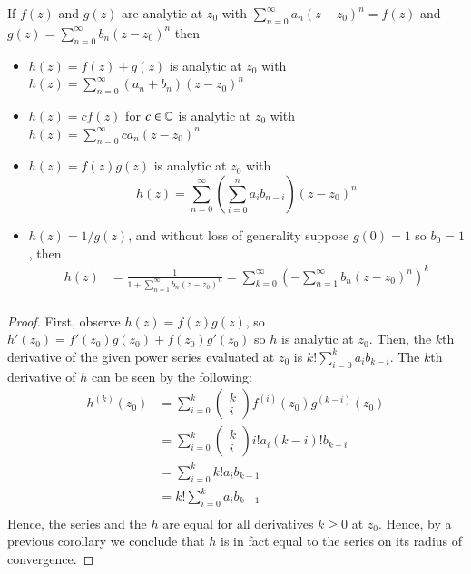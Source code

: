 \documentclass[12pt, a4paper, oneside, openright, titlepage]{book}
\begin{document}
\begin{thm}
    If $f(z)$ and $g(z)$ are analytic at $z_0$ with $\sum_{n=0}^{\infty}a_n(z-z_0)^n = f(z)$ and $g(z) = \sum_{n=0}^{\infty}b_n(z-z_0)^n$ then \begin{itemize}
        \item $h(z) = f(z) + g(z)$ is analytic at $z_0$ with $h(z) = \sum_{n=0}^{\infty}(a_n+b_n)(z-z_0)^n$
        \item $h(z) = cf(z)$ for $c \in \mathbb C$ is analytic at $z_0$ with $h(z) = \sum_{n=0}^{\infty}ca_n(z-z_0)^n$
        \item $h(z) = f(z)g(z)$ is analytic at $z_0$ with $$h(z) = \sum_{n=0}^{\infty}\left(\sum_{i=0}^na_ib_{n-i}\right)(z-z_0)^n$$
        \item $h(z) = 1/g(z)$, and without loss of generality suppose $g(0) = 1$ so $b_0 = 1$, then \begin{align*}
                h(z) &= \frac{1}{1+\sum_{n=1}^{\infty}b_n(z-z_0)^n} = \sum_{k=0}^{\infty}\left(-\sum_{n=1}^{\infty}b_n(z-z_0)^n\right)^k \\
        \end{align*}
        \end{itemize}
\end{thm}
\begin{proof}
    First, observe $h(z) = f(z)g(z)$, so $h'(z_0) = f'(z_0)g(z_0) + f(z_0)g'(z_0)$ so $h$ is analytic at $z_0$. Then, the $k$th derivative of the given power series evaluated at $z_0$ is $k!\sum_{i=0}^ka_ib_{k-i}$. The $k$th derivative of $h$ can be seen by the following: \begin{align*}
        h^{(k)}(z_0) &= \sum_{i=0}^k\left(\begin{array}{c} k \\ i \end{array}\right)f^{(i)}(z_0)g^{(k-i)}(z_0) \\
            &= \sum_{i=0}^k\left(\begin{array}{c} k \\ i \end{array}\right)i!a_i(k-i)!b_{k-i} \\
            &= \sum_{i=0}^k k!a_ib_{k-1} \\
            &= k!\sum_{i=0}^k a_ib_{k-1} \\
    \end{align*}
    Hence, the series and the $h$ are equal for all derivatives $k \geq 0$ at $z_0$. Hence, by a previous corollary we conclude that $h$ is in fact equal to the series on its radius of convergence.
\end{proof}
\end{document}
